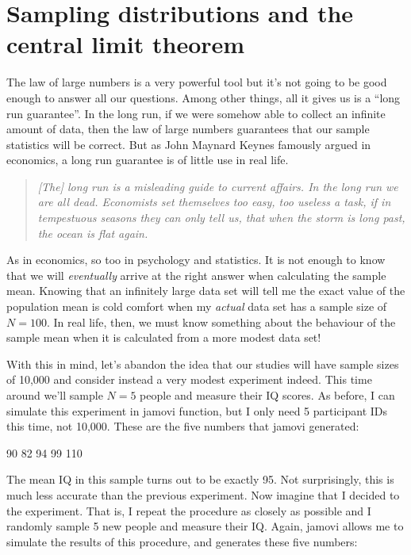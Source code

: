\section{Sampling distributions and the central limit theorem~\label{sec:samplesandclt}}

The law of large numbers is a very powerful tool but it's not going to be good enough to answer all our questions. Among other things, all it gives us is a ``long run guarantee''. In the long run, if we were somehow able to collect an infinite amount of data, then the law of large numbers guarantees that our sample statistics will be correct. But as John Maynard Keynes famously argued in economics, a long run guarantee is of little use in real life.
\begin{quote}
{\it [The] long run is a misleading guide to current affairs. In the long run we are all dead. Economists set themselves too easy, too useless a task, if in tempestuous seasons they can only tell us, that when the storm is long past, the ocean is flat again.} \parencite[p.~80]{Keynes1923}
\end{quote}
As in economics, so too in psychology and statistics. It is not enough to know that we will {\it eventually} arrive at the right answer when calculating the sample mean. Knowing that an infinitely large data set will tell me the exact value of the population mean is cold comfort when my {\it actual} data set has a sample size of $N=100$. In real life, then, we must know something about the behaviour of the sample mean when it is calculated from a more modest data set!


With this in mind, let's abandon the idea that our studies will have sample sizes of 10,000 and consider instead a very modest experiment indeed. This time around we'll sample $N=5$ people and measure their IQ scores. As before, I can simulate this experiment in jamovi  function, but I only need 5 participant IDs this time, not 10,000. These are the five numbers that jamovi generated:

\begin{rblock1}
90 82 94 99 110
\end{rblock1}

The mean IQ in this sample turns out to be exactly 95. Not surprisingly, this is much less accurate than the previous experiment. Now imagine that I decided to  the experiment. That is, I repeat the procedure as closely as possible and I randomly sample 5 new people and measure their IQ. Again, jamovi allows me to simulate the results of this procedure, and generates these five numbers:

